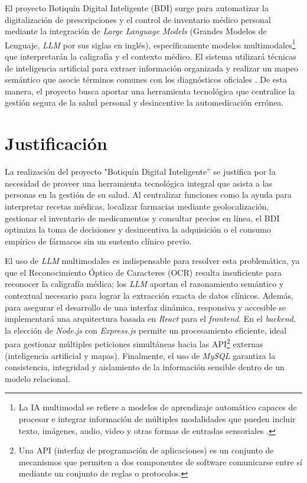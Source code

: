 El proyecto Botiquín Digital Inteligente ({BDI}) surge para automatizar la digitalización de prescripciones y el control de inventario médico personal mediante la integración de \emph{Large Language Models} (Grandes Modelos de Lenguaje, \emph{LLM} por sus siglas en inglés), específicamente modelos multimodales\footnote{La IA multimodal se refiere a modelos de aprendizaje automático capaces de procesar e integrar información de múltiples modalidades que pueden incluir texto, imágenes, audio, video y otras formas de entradas sensoriales \cite{multimodales}.} que interpretarán la caligrafía y el contexto médico. El sistema utilizará técnicas de inteligencia artificial para extraer información organizada y realizar un mapeo semántico que asocie términos comunes con los diagnósticos oficiales \cite{CIE10}. De esta manera, el proyecto busca aportar una herramienta tecnológica que centralice la gestión segura de la salud personal y desincentive la automedicación errónea.


\section{Justificación}

La realización del proyecto "Botiquín Digital Inteligente” se justifica por la necesidad de proveer una herramienta tecnológica integral que asista a las personas en la gestión de su salud. Al centralizar funciones como la ayuda para interpretar recetas médicas, localizar farmacias mediante geolocalización, gestionar el inventario de medicamentos y consultar precios en línea, el BDI optimiza la toma de decisiones y desincentiva la adquisición o el consumo empírico de fármacos sin un sustento clínico previo.

El uso de \emph{LLM} multimodales es indispensable para resolver esta problemática, ya que el Reconocimiento Óptico de Caracteres (OCR) resulta insuficiente para reconocer la caligrafía médica; los \emph{LLM} aportan el razonamiento semántico y contextual necesario para lograr la extracción exacta de datos clínicos. Además, para asegurar el desarrollo de una interfaz dinámica, responsiva y accesible se implementará una arquitectura basada en \emph{React} para el \emph{frontend}. En el \emph{backend}, la elección de \emph{Node.js} con \emph{Express.js} permite un procesamiento eficiente, ideal para gestionar múltiples peticiones simultáneas hacia las API\footnote{Una API (interfaz de programación de aplicaciones) es un conjunto de mecanismos que permiten a dos componentes de software comunicarse entre sí mediante un conjunto de reglas o protocolos.\cite{apidef}} externas (inteligencia artificial y mapas). Finalmente, el uso de \emph{MySQL} garantiza la consistencia, integridad y aislamiento de la información sensible dentro de un modelo relacional.

